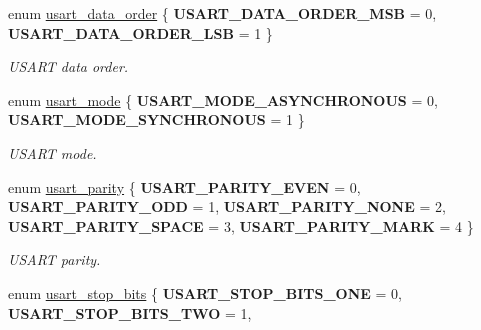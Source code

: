 \begin{DoxyCompactItemize}
\item 
\mbox{\label{group___h_p_l_ga426849bbd9655cec091101ebc9123eb4}} 
enum \hyperlink{group___h_p_l_ga426849bbd9655cec091101ebc9123eb4}{usart\+\_\+data\+\_\+order} \{ {\bfseries U\+S\+A\+R\+T\+\_\+\+D\+A\+T\+A\+\_\+\+O\+R\+D\+E\+R\+\_\+\+M\+SB} = 0, 
{\bfseries U\+S\+A\+R\+T\+\_\+\+D\+A\+T\+A\+\_\+\+O\+R\+D\+E\+R\+\_\+\+L\+SB} = 1
 \}\begin{DoxyCompactList}\small\item\em U\+S\+A\+RT data order. \end{DoxyCompactList}
\item 
\mbox{\label{group___h_p_l_ga1c465965478e0f6908a4c99d4f3ad20f}} 
enum \hyperlink{group___h_p_l_ga1c465965478e0f6908a4c99d4f3ad20f}{usart\+\_\+mode} \{ {\bfseries U\+S\+A\+R\+T\+\_\+\+M\+O\+D\+E\+\_\+\+A\+S\+Y\+N\+C\+H\+R\+O\+N\+O\+US} = 0, 
{\bfseries U\+S\+A\+R\+T\+\_\+\+M\+O\+D\+E\+\_\+\+S\+Y\+N\+C\+H\+R\+O\+N\+O\+US} = 1
 \}\begin{DoxyCompactList}\small\item\em U\+S\+A\+RT mode. \end{DoxyCompactList}
\item 
\mbox{\label{group___h_p_l_ga867cc5f0ea7d3bf651d68f0046cf6f41}} 
enum \hyperlink{group___h_p_l_ga867cc5f0ea7d3bf651d68f0046cf6f41}{usart\+\_\+parity} \{ \newline
{\bfseries U\+S\+A\+R\+T\+\_\+\+P\+A\+R\+I\+T\+Y\+\_\+\+E\+V\+EN} = 0, 
{\bfseries U\+S\+A\+R\+T\+\_\+\+P\+A\+R\+I\+T\+Y\+\_\+\+O\+DD} = 1, 
{\bfseries U\+S\+A\+R\+T\+\_\+\+P\+A\+R\+I\+T\+Y\+\_\+\+N\+O\+NE} = 2, 
{\bfseries U\+S\+A\+R\+T\+\_\+\+P\+A\+R\+I\+T\+Y\+\_\+\+S\+P\+A\+CE} = 3, 
\newline
{\bfseries U\+S\+A\+R\+T\+\_\+\+P\+A\+R\+I\+T\+Y\+\_\+\+M\+A\+RK} = 4
 \}\begin{DoxyCompactList}\small\item\em U\+S\+A\+RT parity. \end{DoxyCompactList}
\item 
\mbox{\label{group___h_p_l_ga88311517c5168c29a681604a8a33b06e}} 
enum \hyperlink{group___h_p_l_ga88311517c5168c29a681604a8a33b06e}{usart\+\_\+stop\+\_\+bits} \{ {\bfseries U\+S\+A\+R\+T\+\_\+\+S\+T\+O\+P\+\_\+\+B\+I\+T\+S\+\_\+\+O\+NE} = 0, 
{\bfseries U\+S\+A\+R\+T\+\_\+\+S\+T\+O\+P\+\_\+\+B\+I\+T\+S\+\_\+\+T\+WO} = 1, 

\end{DoxyCompactItemize}
